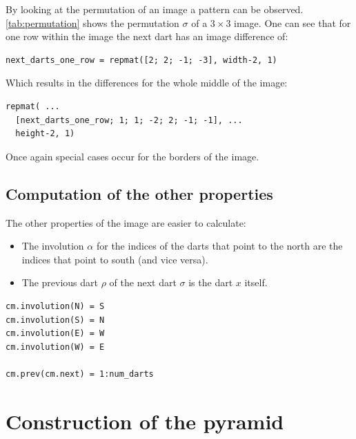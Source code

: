\documentclass[12pt]{article}
\begin{document}
By looking at the permutation of an image a pattern can be observed. \cref{tab:permutation} shows the permutation \( \sigma \) of a \( 3 \times 3 \) image. One can see that for one row within the image the next dart has an image difference of:
\begin{lstlisting}
next_darts_one_row = repmat([2; 2; -1; -3], width-2, 1)
\end{lstlisting}
Which results in the differences for the whole middle of the image:

\begin{lstlisting}
repmat( ...
  [next_darts_one_row; 1; 1; -2; 2; -1; -1], ...
  height-2, 1)
\end{lstlisting}

Once again special cases occur for the borders of the image.


\subsection{Computation of the other properties}%
\label{sub:computation_of_the_other_properties}

The other properties of the image are easier to calculate:

\begin{itemize}
  \item The involution \( \alpha \) for the indices of the darts that point to the north are the indices that point to south (and vice versa).
  \item The previous dart \( \rho \)  of the next dart \( \sigma \) is the dart \( x \) itself.
\end{itemize}

\begin{lstlisting}
cm.involution(N) = S
cm.involution(S) = N
cm.involution(E) = W
cm.involution(W) = E

cm.prev(cm.next) = 1:num_darts
\end{lstlisting}




\section{Construction of the pyramid}%
\label{sec:construction_of_the_pyramid}
\end{document}
